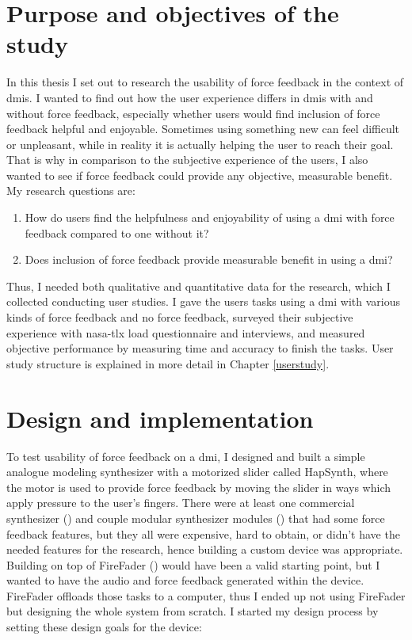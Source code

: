 \section{Purpose and objectives of the study} \label{purpose}

In this thesis I set out to research the usability of force feedback in the context of \glspl{dmi}. I wanted to find out how the user experience differs in \glspl{dmi} with and without force feedback, especially whether users would find inclusion of force feedback helpful and enjoyable. Sometimes using something new can feel difficult or unpleasant, while in reality it is actually helping the user to reach their goal. That is why in comparison to the subjective experience of the users, I also wanted to see if force feedback could provide any objective, measurable benefit. My research questions are:

\begin{enumerate}
	\item How do users find the helpfulness and enjoyability of using a \gls{dmi} with force feedback compared to one without it?
	\item Does inclusion of force feedback provide measurable benefit in using a \gls{dmi}?
\end{enumerate}

Thus, I needed both qualitative and quantitative data for the research, which I collected conducting user studies. I gave the users tasks using a \gls{dmi} with various kinds of force feedback and no force feedback, surveyed their subjective experience with \gls{nasa-tlx} load questionnaire and interviews, and measured objective performance by measuring time and accuracy to finish the tasks. User study structure is explained in more detail in Chapter \ref{userstudy}.

\section{Design and implementation}

To test usability of force feedback on a \gls{dmi}, I designed and built a simple analogue modeling synthesizer with a motorized slider called HapSynth, where the motor is used to provide force feedback by moving the slider in ways which apply pressure to the user's fingers. There were at least one commercial synthesizer (\cite{melbourneinstruments2024}) and couple modular synthesizer modules (\cite{dmm2024, submatrix2024}) that had some force feedback features, but they all were expensive, hard to obtain, or didn't have the needed features for the research, hence building a custom device was appropriate. Building on top of FireFader (\cite{berdahl-kontogeorgakopoulos2013}) would have been a valid starting point, but I wanted to have the audio and force feedback generated within the device. FireFader offloads those tasks to a computer, thus I ended up not using FireFader but designing the whole system from scratch. I started my design process by setting these design goals for the device:

